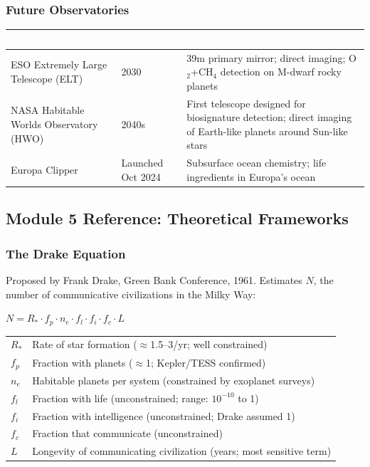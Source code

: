 \documentclass[11pt,letterpaper]{article}
\newcommand{\tableheader}[1]{\textbf{\sffamily\textcolor{white}{#1}}}
\begin{document}
\subsubsection{Future Observatories}

\begin{center}
\begin{tabularx}{\textwidth}{L{4cm}L{2.5cm}X}
\toprule
{}
\tableheader{Observatory} & \tableheader{Timeline} & \tableheader{Capability} \\
\midrule
ESO Extremely Large Telescope (ELT) & 2030 & 39m primary mirror; direct imaging; O$_2$+CH$_4$ detection on M-dwarf rocky planets \\
NASA Habitable Worlds Observatory (HWO) & 2040s & First telescope designed for biosignature detection; direct imaging of Earth-like planets around Sun-like stars \\
Europa Clipper & Launched Oct 2024 & Subsurface ocean chemistry; life ingredients in Europa's ocean \\
\bottomrule
\end{tabularx}
\end{center}

\subsection{Module 5 Reference: Theoretical Frameworks}

\subsubsection{The Drake Equation}

Proposed by Frank Drake, Green Bank Conference, 1961. Estimates $N$, the number of communicative civilizations in the Milky Way:

\begin{center}
\begin{tcolorbox}[colback=lightprimary, colframe=primary, arc=2pt]
$N = R_* \cdot f_p \cdot n_e \cdot f_l \cdot f_i \cdot f_c \cdot L$

\smallskip
\begin{tabular}{ll}
$R_*$ & Rate of star formation ($\approx$1.5--3/yr; well constrained) \\
$f_p$ & Fraction with planets ($\approx$1; Kepler/TESS confirmed) \\
$n_e$ & Habitable planets per system (constrained by exoplanet surveys) \\
$f_l$ & Fraction with life (unconstrained; range: $10^{-10}$ to 1) \\
$f_i$ & Fraction with intelligence (unconstrained; Drake assumed 1) \\
$f_c$ & Fraction that communicate (unconstrained) \\
$L$ & Longevity of communicating civilization (years; most sensitive term) \\
\end{tabular}
\end{tcolorbox}
\end{center}
\end{document}
